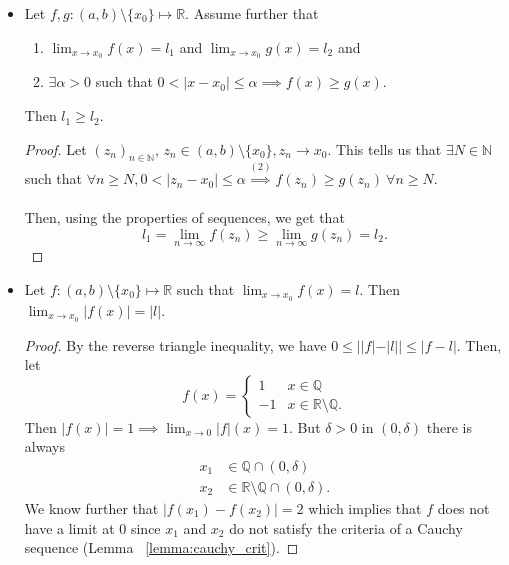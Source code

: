 \documentclass{article}
\newcommand{\Q}{\mathbb{Q}}
\newcommand{\R}{\mathbb{R}}
\newcommand{\N}{\mathbb{N}}
\newcommand{\seq}[2]{(#1_{#2})_{#2 \in \N}}
\newcommand{\?}{\stackrel{?}{=}}
\theoremstyle{definition} %
\begin{document}
\begin{itemize}
    \item[]
    \begin{lemma}
        Let $f, g: (a, b) \setminus\{x_0\} \mapsto \R$. Assume further that
        \begin{enumerate}[label=(\arabic*)]
            \item $\lim_{x \to x_0} f(x) = l_1$ and $\lim_{x \to x_0} g(x) = l_2$ and
            \item $\exists \alpha > 0$ such that $0 < |x - x_0| \leq \alpha \implies f(x) \geq g(x)$.
        \end{enumerate}
        Then $l_1 \geq l_2$.
        \label{lemma:three_four_one}
    \end{lemma}
    \begin{proof}
        Let $\seq{z}{n}$, $z_n \in (a, b) \setminus\{x_0\}, z_n \rightarrow x_0$. This tells us that $\exists N \in \N$ such that $\forall n \geq N, 0 < |z_n - x_0| \leq \alpha \overset{(2)}{\implies} f(z_n) \geq g(z_n) \ \forall n \geq N$. \\\\
        Then, using the properties of sequences, we get that
        $$l_1 = \lim_{n \to \infty} f(z_n) \geq \lim_{n \to \infty} g(z_n) = l_2.$$
    \end{proof}
    \item[]
    \begin{lemma}
        Let $f: (a, b) \setminus \{x_0\} \mapsto \R$ such that $\lim_{x \to x_0} f(x) = l$. Then $\lim_{x \to x_0} |f(x)| = |l|$.
    \end{lemma}
    \begin{proof}
        By the reverse triangle inequality, we have $0 \leq ||f| - |l|| \leq |f - l|$. Then, let
        \[
        f(x) =
        \begin{cases}
            1 & x \in \Q \\
            -1 & x \in \R \setminus \Q.
        \end{cases}
        \]
        Then $|f(x)| = 1 \implies \lim_{x \to 0} |f|(x) = 1$. But $\delta > 0$ in $(0, \delta)$ there is always
        \begin{align*}
            x_1 &\in \Q \cap (0, \delta) \\
            x_2 &\in \R \setminus \Q \cap (0, \delta).
        \end{align*}
        We know further that $|f(x_1) - f(x_2)| = 2$ which implies that $f$ does not have a limit at 0 since $x_1$ and $x_2$ do not satisfy the criteria of a Cauchy sequence (Lemma ~\ref{lemma:cauchy_crit}).

\end{proof}
\end{itemize}
\end{document}
